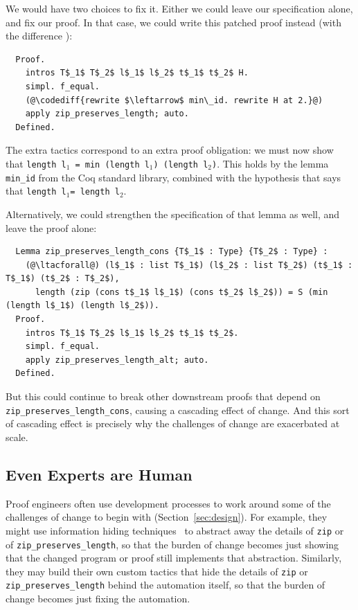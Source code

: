 We would have two choices to fix it. Either we could leave our specification alone,
and fix our proof.
In that case, we could write this patched proof instead (with the difference ):

\begin{lstlisting}
  Proof.
    intros T$_1$ T$_2$ l$_1$ l$_2$ t$_1$ t$_2$ H.
    simpl. f_equal.
    (@\codediff{rewrite $\leftarrow$ min\_id. rewrite H at 2.}@)
    apply zip_preserves_length; auto.
  Defined.
\end{lstlisting}
The extra tactics correspond to an extra proof obligation:
we must now show that \lstinline{length l}$_1$\lstinline{ = min (length l}$_1$\lstinline{) (length l}$_2$\lstinline{)}.
This holds by the lemma \lstinline{min_id} from the Coq standard library, combined with the hypothesis that says that \lstinline{length l}$_1$\lstinline{= length l}$_2$.

Alternatively, we could strengthen the specification of that lemma as well, and leave the proof alone:

\begin{lstlisting}
  Lemma zip_preserves_length_cons {T$_1$ : Type} {T$_2$ : Type} :
    (@\ltacforall@) (l$_1$ : list T$_1$) (l$_2$ : list T$_2$) (t$_1$ : T$_1$) (t$_2$ : T$_2$),
      length (zip (cons t$_1$ l$_1$) (cons t$_2$ l$_2$)) = S (min (length l$_1$) (length l$_2$)).
  Proof.
    intros T$_1$ T$_2$ l$_1$ l$_2$ t$_1$ t$_2$.
    simpl. f_equal.
    apply zip_preserves_length_alt; auto.
  Defined.
\end{lstlisting}
But this could continue to break other downstream proofs that depend on \lstinline{zip_preserves_length_cons},
causing a cascading effect of change.
And this sort of cascading effect is precisely why the challenges of change are exacerbated at scale.

\subsection{Even Experts are Human}
\label{sec:irl}

Proof engineers often use development processes to work around some of the challenges of change to begin with (Section~\ref{sec:design}).
For example, they might use information hiding techniques~\cite{Woos:2016:PCF:2854065.2854081, Klein2014}
to abstract away the details of \lstinline{zip} or of \lstinline{zip_preserves_length},
so that the burden of change becomes just showing that the changed program or proof still implements that abstraction.
Similarly, they may build their own custom tactics that hide the details of
\lstinline{zip} or \lstinline{zip_preserves_length} behind the automation itself,
so that the burden of change becomes just fixing the automation.
 
